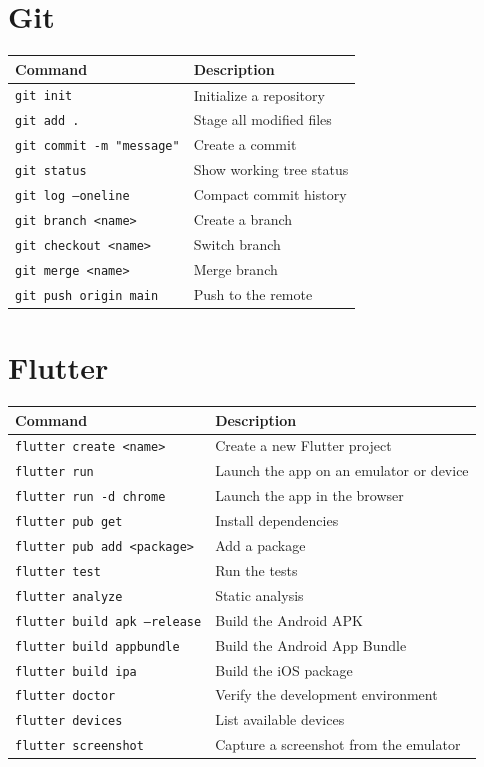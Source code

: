 \section{Git}

\begin{center}
\begin{tabularx}{\textwidth}{l X}
\toprule
\textbf{Command} & \textbf{Description} \\
\midrule
\texttt{git init} & Initialize a repository \\
\texttt{git add .} & Stage all modified files \\
\texttt{git commit -m "message"} & Create a commit \\
\texttt{git status} & Show working tree status \\
\texttt{git log --oneline} & Compact commit history \\
\texttt{git branch <name>} & Create a branch \\
\texttt{git checkout <name>} & Switch branch \\
\texttt{git merge <name>} & Merge branch \\
\texttt{git push origin main} & Push to the remote \\
\bottomrule
\end{tabularx}
\end{center}

\section{Flutter}

\begin{center}
\begin{tabularx}{\textwidth}{l X}
\toprule
\textbf{Command} & \textbf{Description} \\
\midrule
\texttt{flutter create <name>} & Create a new Flutter project \\
\texttt{flutter run} & Launch the app on an emulator or device \\
\texttt{flutter run -d chrome} & Launch the app in the browser \\
\texttt{flutter pub get} & Install dependencies \\
\texttt{flutter pub add <package>} & Add a package \\
\texttt{flutter test} & Run the tests \\
\texttt{flutter analyze} & Static analysis \\
\texttt{flutter build apk --release} & Build the Android APK \\
\texttt{flutter build appbundle} & Build the Android App Bundle \\
\texttt{flutter build ipa} & Build the iOS package \\
\texttt{flutter doctor} & Verify the development environment \\
\texttt{flutter devices} & List available devices \\
\texttt{flutter screenshot} & Capture a screenshot from the emulator \\
\bottomrule
\end{tabularx}
\end{center}

